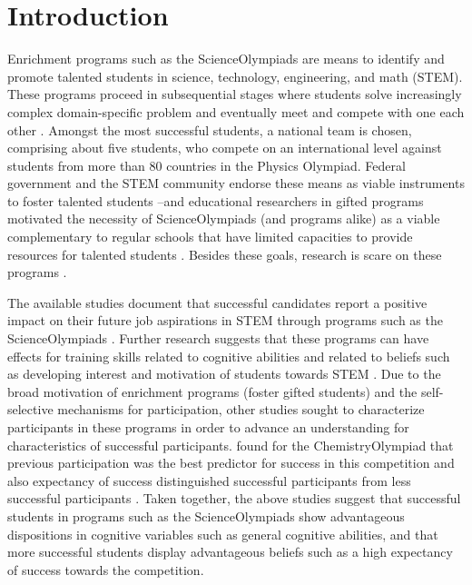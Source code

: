 \documentclass[]{interact}
\begin{document}
\section{Introduction}

Enrichment programs such as the ScienceOlympiads are means to identify and promote talented students in science, technology, engineering, and math (STEM). These programs proceed in subsequential stages where students solve increasingly complex domain-specific problem and eventually meet and compete with one each other \citep{Petersen.2017}. Amongst the most successful students, a national team is chosen, comprising about five students, who compete on an international level against students from more than 80 countries in the Physics Olympiad. Federal government and the STEM community endorse these means as viable instruments to foster talented students \citep{KMK.2009,Petersen.2017}--and educational researchers in gifted programs motivated the necessity of ScienceOlympiads (and programs alike) as a viable complementary to regular schools that have limited capacities to provide resources for talented students \citep{Reis.2010}. Besides these goals, research is scare on these programs \citep{Ziegler.2004}.

The available studies document that successful candidates report a positive impact on their future job aspirations in STEM through programs such as the ScienceOlympiads \citep{Feng.2001,Oswald.2004,Subotnik.1993}. Further research suggests that these programs can have effects for training skills related to cognitive abilities and related to beliefs such as developing interest and motivation of students towards STEM \citep{Oswald.2004,Aljughaiman.2012,Wai.2010,Marsh.1995}. Due to the broad motivation of enrichment programs (foster gifted students) and the self-selective mechanisms for participation, other studies sought to characterize participants in these programs in order to advance an understanding for characteristics of successful participants. \cite{Urhahne.2012} found for the ChemistryOlympiad that previous participation was the best predictor for success in this competition and also expectancy of success distinguished successful participants from less successful participants \citep[similar findings in:][]{Stang.2014}. Taken together, the above studies suggest that successful students in programs such as the ScienceOlympiads show advantageous dispositions in cognitive variables such as general cognitive abilities, and that more successful students display advantageous beliefs such as a high expectancy of success towards the competition.
\end{document}
